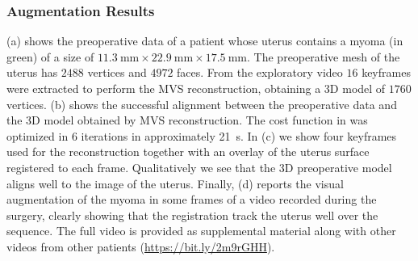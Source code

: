 


\subsubsection{Augmentation Results}
(a) shows the preoperative data of a patient whose uterus contains a myoma (in green) of a size of $\SI{11.3}{\milli\metre}\times\SI{22.9}{\milli\metre}\times\SI{17.5}{\milli\metre}$. The preoperative mesh of the uterus has $2488$ vertices and $4972$ faces. 
From the exploratory video $16$ keyframes were extracted to perform the MVS reconstruction, obtaining a 3D model of $1760$ vertices.
(b) shows the successful alignment between the preoperative data and the 3D model obtained by MVS reconstruction. The cost function in  was optimized in $6$ iterations in approximately \SI{21}{\second}. 
In (c) we show four keyframes used for the reconstruction together with an overlay of the uterus surface registered to each frame. Qualitatively we see that the 3D preoperative model aligns well to the image of the uterus.
Finally, (d) reports the visual augmentation of the myoma in some frames of a video recorded during the surgery, clearly showing that the registration track the uterus well over the sequence. 
The full video is provided as supplemental material along with other videos from other patients (\url{https://bit.ly/2m9rGHH}).


